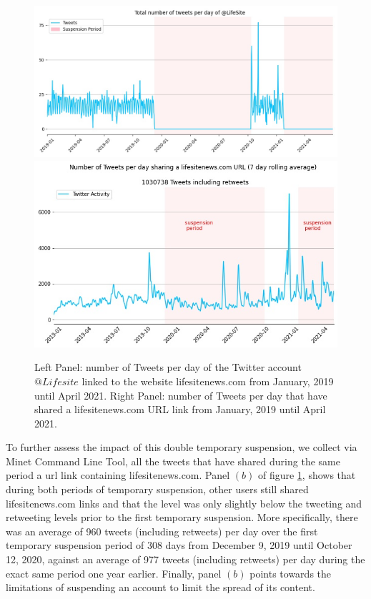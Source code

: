 \documentclass{article}
\begin{document}
\begin{figure}[h]
\centering
		\includegraphics[scale=0.3]{../figure/lifesite.jpg} 
		\includegraphics[scale=0.34]{./img/lifesite_rolling_7_lifesite.jpg}
\caption{Left Panel: number of Tweets per day of the Twitter account $@Lifesite$ linked to the website lifesitenews.com from January, 2019 until April 2021. Right Panel: number of Tweets per day that have shared a lifesitenews.com URL link from January, 2019 until April 2021. }
\label{fig2}
\end{figure}

To further assess the impact of this double temporary suspension, we collect via Minet Command Line Tool\cite{minet}, all the tweets that have shared during the same period a url link containing lifesitenews.com. Panel $(b)$ of figure \ref{fig2}, shows that during both periods of temporary suspension, other users still shared lifesitenews.com links and that the level was only slightly below the tweeting and retweeting levels prior to the first temporary suspension. More specifically, there was an average of 960 tweets (including retweets) per day over the first temporary suspension period of 308 days from December 9, 2019 until October 12, 2020, against an average of 977 tweets (including retweets) per day during the exact same period one year earlier. Finally, panel $(b)$ points towards the limitations of suspending an account to limit the spread of its content. 
\end{document}
